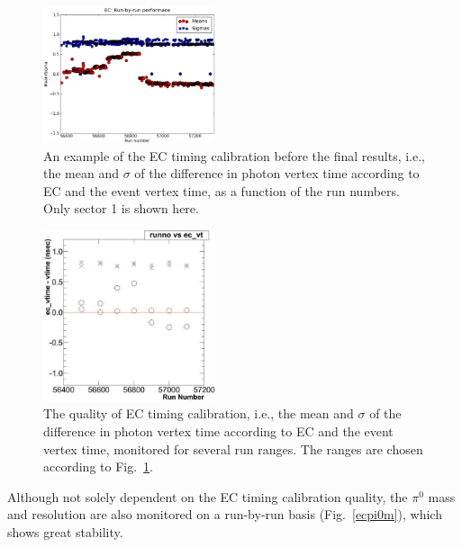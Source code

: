 \begin{figure}[h]
\begin{center}
 \includegraphics[width=0.45\textwidth]{figures/calib/ec/ec_vtimebyrunsec.eps}
  \caption{An example of the EC timing calibration before the final results, i.e., the mean and $\sigma$ of the difference in photon vertex time according to EC and the event vertex time, as a function of the run numbers. Only sector 1 is shown here.}
  \label{ectrunsec}
  \end{center}
\end{figure}

\begin{figure}[h]
\begin{center}
 \includegraphics[width=0.45\textwidth]{figures/calib/ec/ec_vtimebyrun.eps}
  \caption{The quality of EC timing calibration, i.e., the mean and $\sigma$ of the difference in photon vertex time according to EC and the event vertex time, monitored for several run ranges. The ranges are chosen according to Fig.~\ref{ectrunsec}.}
  \label{ectrun}
  \end{center}
\end{figure}

Although not solely dependent on the EC timing calibration quality, the $\pi^0$ mass and resolution are also monitored on a run-by-run basis (Fig.~\ref{ecpi0m}), which shows great stability.


